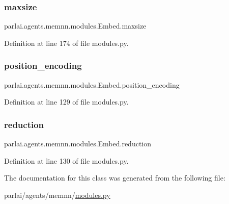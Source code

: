 \subsubsection{\texorpdfstring{maxsize}{maxsize}}
{\footnotesize\ttfamily parlai.\+agents.\+memnn.\+modules.\+Embed.\+maxsize\hspace{0.3cm}{\ttfamily [static]}}



Definition at line 174 of file modules.\+py.

\mbox{\label{classparlai_1_1agents_1_1memnn_1_1modules_1_1Embed_af0373995dcb0351175527b06b1db8874}} 
\subsubsection{\texorpdfstring{position\+\_\+encoding}{position\_encoding}}
{\footnotesize\ttfamily parlai.\+agents.\+memnn.\+modules.\+Embed.\+position\+\_\+encoding}



Definition at line 129 of file modules.\+py.

\mbox{\label{classparlai_1_1agents_1_1memnn_1_1modules_1_1Embed_a93010185a49bafacc478d85856d1c95d}} 
\subsubsection{\texorpdfstring{reduction}{reduction}}
{\footnotesize\ttfamily parlai.\+agents.\+memnn.\+modules.\+Embed.\+reduction}



Definition at line 130 of file modules.\+py.



The documentation for this class was generated from the following file\+:\begin{DoxyCompactItemize}
\item 
parlai/agents/memnn/\hyperlink{parlai_2agents_2memnn_2modules_8py}{modules.\+py}\end{DoxyCompactItemize}
